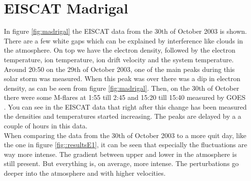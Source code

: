 
\section{EISCAT Madrigal}
In figure \ref{fig:madrigal} the EISCAT data from the 30th of October 2003 is shown. There are a few white gaps which can be explained by interference like clouds in the atmosphere. On top we have the electron density, followed by the electron temperature, ion temperature, ion drift velocity and the system temperature. \\

Around 20:50 on the 29th of October 2003, one of the main peaks during this solar storm was measured. When this peak was over there was a dip in electron density, as can be seen from figure \ref{fig:madrigal}. Then, on the 30th of October there were some M-flares at 1:55 till 2:45 and 15:20 till 15:40 measured by GOES \cite{goes_x-ray_archive}. You can see in the EISCAT data that right after this change has been measured the densities and temperatures started increasing. The peaks are delayed by a a couple of hours in this data. \\

When comparing the data from the 30th of October 2003 to a more quit day, like the one in figure \ref{fig::resultsE1}, it can be seen that especially the fluctuations are way more intense. The gradient between upper and lower in the atmosphere is still present. But everything is, on average, more intense. The perturbations go deeper into the atmosphere and with higher velocities.





